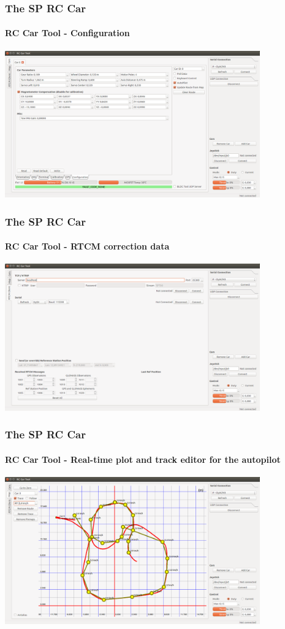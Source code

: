 \documentclass[aspectratio=169,electronics,notopline]{beamer}
\begin{document}
\begin{frame} 
\frametitle{The SP RC Car}
\framesubtitle{RC Car Tool - Configuration}
\begin{center}
	\includegraphics[width=11cm]{Figures/GUI/car_config.png}
\end{center}
\end{frame}

\begin{frame} 
\frametitle{The SP RC Car}
\framesubtitle{RC Car Tool - RTCM correction data}
\begin{center}
	\includegraphics[width=11cm]{Figures/GUI/car_rtcm.png}
\end{center}
\end{frame}

\begin{frame} 
\frametitle{The SP RC Car}
\framesubtitle{RC Car Tool - Real-time plot and track editor for the autopilot}
\begin{center}
	\includegraphics[width=11cm]{Figures/GUI/car_map.png}
\end{center}
\end{frame}

\spEndFrame
\end{document}
